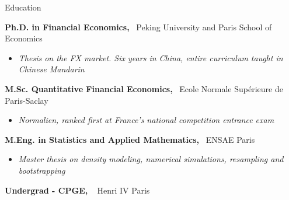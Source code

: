 \documentclass[usegeometry, 10pt, a4paper]{cv} %
\newcommand{\activite}[1]{\textbf{#1}\ }
\begin{document}
\begin{rubriquetableau}[0.95\textwidth]{Education}\\
\vspace{-0.5cm}

\activite{Ph.D. in Financial Economics,} Peking University and Paris School of
Economics\\
\vspace{-0.8cm}  
\begin{itemize}[label={},
  rightmargin=\dimexpr\linewidth-13cm-\leftmargin\relax]
\item \small{\emph{Thesis on the FX market. Six years in China, entire curriculum
    taught in Chinese Mandarin}}
\end{itemize}

\vspace{0.2cm}

\activite{M.Sc. Quantitative Financial Economics,} Ecole Normale Supérieure
de Paris-Saclay \\
\vspace{-0.3cm}
\begin{itemize}[label={}, rightmargin=\dimexpr\linewidth-13cm-\leftmargin\relax]
\item \small{\emph{Normalien, ranked first at France's national competition entrance exam}}
\end{itemize}

\vspace{0.2cm}


\activite{M.Eng. in Statistics and Applied Mathematics,} ENSAE Paris\\
\vspace{-0.3cm}
\begin{itemize}[label={}, rightmargin=\dimexpr\linewidth-13cm-\leftmargin\relax]
\item \small{\emph{Master thesis on density modeling, numerical simulations, resampling and bootstrapping}}
\end{itemize}

\activite{Undergrad - CPGE, } Henri IV Paris\\

\end{rubriquetableau}
\end{document}
